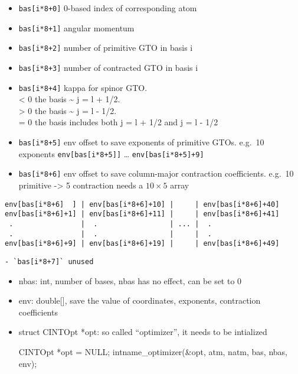 \documentclass[]{article}
\begin{document}
\begin{itemize}
  \begin{itemize}
  \itemsep1pt\parskip0pt
  \item
    \texttt{bas{[}i*8+0{]}} 0-based index of corresponding atom
  \item
    \texttt{bas{[}i*8+1{]}} angular momentum
  \item
    \texttt{bas{[}i*8+2{]}} number of primitive GTO in basis i
  \item
    \texttt{bas{[}i*8+3{]}} number of contracted GTO in basis i
  \item
    \texttt{bas{[}i*8+4{]}} kappa for spinor GTO.\\ \textless{} 0 the
    basis \textasciitilde{} j = l + 1/2.\\ \textgreater{} 0 the basis
    \textasciitilde{} j = l - 1/2.\\ = 0 the basis includes both j = l +
    1/2 and j = l - 1/2
  \item
    \texttt{bas{[}i*8+5{]}} env offset to save exponents of primitive
    GTOs. e.g.~10 exponents \texttt{env{[}bas{[}i*8+5{]}{]}} \ldots{}
    \texttt{env{[}bas{[}i*8+5{]}+9{]}}
  \item
    \texttt{bas{[}i*8+6{]}} env offset to save column-major contraction
    coefficients. e.g.~10 primitive -\textgreater{} 5 contraction needs
    a $10\times 5$ array
  \end{itemize}
\end{itemize}

\begin{verbatim}
env[bas[i*8+6]  ] | env[bas[i*8+6]+10] |     | env[bas[i*8+6]+40]
env[bas[i*8+6]+1] | env[bas[i*8+6]+11] |     | env[bas[i*8+6]+41]
 .                |  .                 | ... |  .                
 .                |  .                 |     |  .                
env[bas[i*8+6]+9] | env[bas[i*8+6]+19] |     | env[bas[i*8+6]+49]
\end{verbatim}

\begin{verbatim}
- `bas[i*8+7]` unused
\end{verbatim}

\begin{itemize}
\item
  nbas: int, number of bases, nbas has no effect, can be set to 0
\item
  env: double{[}{]}, save the value of coordinates, exponents,
  contraction coefficients
\item
  struct CINTOpt *opt: so called ``optimizer'', it needs to be
  intialized

  CINTOpt *opt = NULL; intname\_optimizer(\&opt, atm, natm, bas, nbas,
  env);
\end{itemize}
\end{document}
